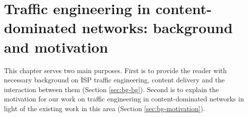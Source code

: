 \chapter{Traffic engineering in content-dominated networks: background and motivation}
\label{ch:te-background}

This chapter serves two main purposes. First is to provide the reader with necessary background on ISP traffic engineering, content delivery and the interaction between them (Section \ref{sec:bg-bg}). Second is to explain the motivation for our work on traffic engineering in content-dominated networks in light of the existing work in this area (Section \ref{sec:bg-motivation}).




%






